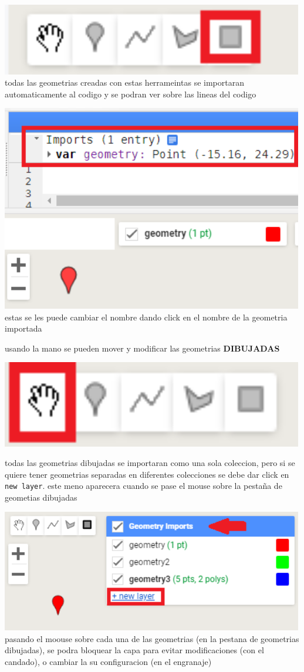 \documentclass[
]{article}
\begin{document}
\begin{tipblock}
\includegraphics[width=500px]{Img/rec} todas las geometrias creadas con
estas herrameintas se importaran automaticamente al codigo y se podran
ver sobre las lineas del codigo

\includegraphics[width=500px]{Img/import} estas se les puede cambiar el
nombre dando click en el nombre de la geometria importada

usando la mano se pueden mover y modificar las geometrias
\textbf{DIBUJADAS}

\includegraphics[width=500px]{Img/mano}

todas las geometrias dibujadas se importaran como una sola coleccion,
pero si se quiere tener geometrias separadas en diferentes colecciones
se debe dar click en \texttt{new\ layer}. este meno aparecera cuando se
pase el mouse sobre la pestaña de geometias dibujadas

\includegraphics[width=500px]{Img/nuevaGeo} pasando el moouse sobre cada
una de las geometrias (en la pestana de geometrias dibujadas), se podra
bloquear la capa para evitar modificaciones (con el candado), o cambiar
la su configuracion (en el engranaje)


\end{tipblock}
\end{document}
